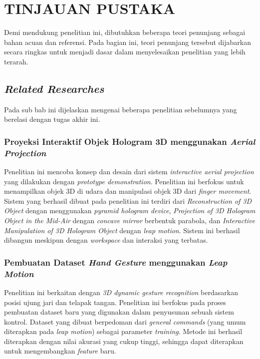 \chapter{TINJAUAN PUSTAKA}
\vspace{4ex}

\hspace{\parindent} Demi mendukung penelitian ini, dibutuhkan beberapa teori penunjang sebagai bahan acuan dan referensi. Pada bagian ini, teori penunjang tersebut dijabarkan secara ringkas untuk menjadi dasar dalam menyelesaikan penelitian yang lebih terarah.
\vspace{2ex}

\section{\textit{Related Researches}}
\vspace{1ex}
	Pada sub bab ini dijelaskan mengenai beberapa penelitian sebelumnya yang berelasi dengan tugas akhir ini.
\vspace{1.5ex}
	
	\subsection{Proyeksi Interaktif Objek Hologram 3D menggunakan \textit{Aerial Projection}}
	\vspace{1ex}
		Penelitian ini mencoba konsep dan desain dari sistem \textit{interactive aerial projection} yang dilakukan dengan \textit{prototype demonstration}. Penelitian ini berfokus untuk menampilkan objek 3D di udara dan manipulasi objek 3D dari \textit{finger movement}. Sistem yang berhasil dibuat pada penelitian ini terdiri dari \textit{Reconstruction of 3D Object} dengan menggunakan \textit{pyramid hologram device}, \textit{Projection of 3D Hologram Object in the Mid-Air} dengan \textit{concave mirror} berbentuk parabola, dan \textit{Interactive Manipulation of 3D Hologram Object} dengan \textit{leap motion}. Sistem ini berhasil dibangun meskipun dengan \textit{workspace} dan interaksi yang terbatas.\cite{mahfud2016interactive}
	\vspace{1.5ex}

	\subsection{Pembuatan Dataset \textit{Hand Gesture} menggunakan \textit{Leap Motion}}
	\vspace{1ex}
		Penelitian ini berkaitan dengan \textit{3D dynamic gesture recognition} berdasarkan posisi ujung jari dan telapak 	tangan. Penelitian ini berfokus pada proses pembuatan dataset baru yang digunakan dalam penyusunan sebuah sistem kontrol. Dataset yang dibuat berpedoman dari \textit{general commands} (yang umum diterapkan pada \textit{leap motion}) sebagai parameter \textit{training}. Metode ini berhasil diterapkan dengan nilai akurasi yang cukup tinggi, sehingga dapat diterapkan untuk mengembangkan \textit{feature} baru.\cite{ameur2016comprehensive}
	\vspace{1.5ex}
	
